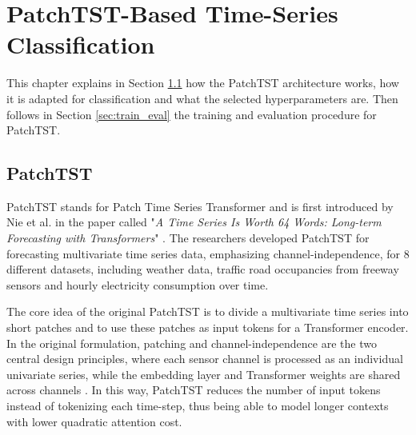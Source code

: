 \chapter{PatchTST-Based Time-Series Classification}\label{ch:methodology}
This chapter explains in Section \ref{sec:patchtst} how the PatchTST architecture works, how it is adapted for classification and what the selected hyperparameters are. Then follows in Section \ref{sec:train_eval} the training and evaluation procedure for PatchTST.

\section{PatchTST}\label{sec:patchtst}
PatchTST stands for Patch Time Series Transformer and is first introduced by Nie et al. in the paper called "\textit{A Time Series Is Worth 64 Words: Long-term Forecasting with Transformers}" \cite{nieTimeSeriesWorth2023b}. The researchers developed PatchTST for forecasting multivariate time series data, emphasizing channel-independence, for 8 different datasets, including weather data, traffic road occupancies from freeway sensors and hourly electricity consumption over time.

The core idea of the original PatchTST is to divide a multivariate time series into short patches and to use these patches as input tokens for a Transformer encoder. In the original formulation, patching and channel-independence are the two central design principles, where each sensor channel is processed as an individual univariate series, while the embedding layer and Transformer weights are shared across channels \cite{nieTimeSeriesWorth2023b}. In this way, PatchTST reduces the number of input tokens instead of tokenizing each time-step, thus being able to model longer contexts with lower quadratic attention cost.

